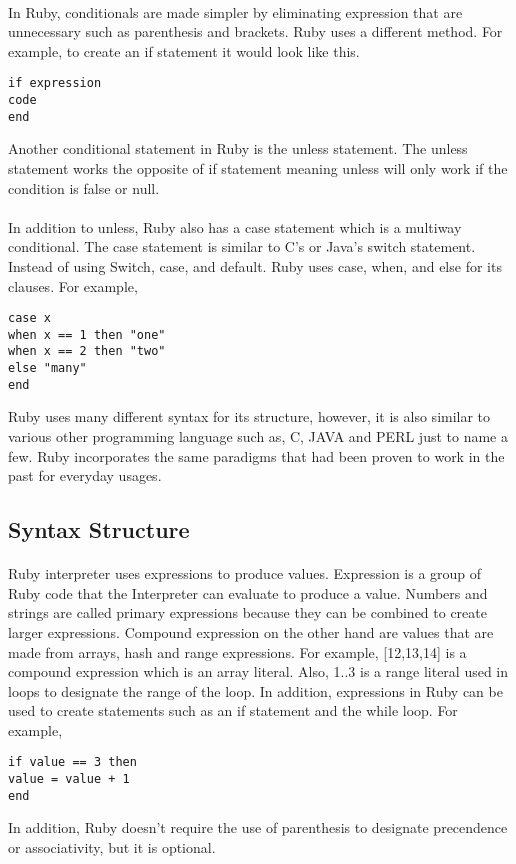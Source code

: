 \documentclass[11pt]{article}
\begin{document}
\paragraph{}
In Ruby, conditionals are made simpler by eliminating expression that are unnecessary such as parenthesis and brackets. Ruby uses a different method. For example, to create an if statement it would look like this. 
\begin{center}

\texttt{if expression \\ code \\ end }

\end{center}
Another conditional statement in Ruby is the unless statement. The unless statement works the opposite of if statement meaning unless will only work if the condition is false or null.
\paragraph{}
In addition to unless, Ruby also has a case statement which is a multiway conditional. The case statement is similar to C's or Java's switch statement. Instead of using Switch, case, and default. Ruby uses case, when, and else for its clauses. For example, 
\begin{center}
 \texttt{case x \\ when x == 1 then "one" \\ when x == 2 then "two" \\ else "many" \\end  }
\end{center}
Ruby uses many different syntax for its structure, however, it is also similar to various other programming language such as, C, JAVA and PERL just to name a few. Ruby incorporates the same paradigms that had been proven to work in the past for everyday usages.
\subsection{Syntax Structure}
\paragraph{}
Ruby interpreter uses expressions to produce values. Expression is a group of Ruby code that the Interpreter can evaluate to produce a value. Numbers and strings are called primary expressions because they can be combined to create larger expressions.\cite{baba} Compound expression on the other hand are values that are made from arrays, hash and range expressions. For example, [12,13,14] is a compound expression which is an array literal. Also, 1..3 is a range literal used in loops to designate the range of the loop.  In addition, expressions in Ruby can be used to create statements such as an if statement and the while loop. For example,
\begin{center}
 \texttt{if value == 3 then \\ 	value = value + 1 \\ end }
\end{center}
In addition, Ruby doesn't require the use of parenthesis to designate precendence or associativity, but it is optional. 
\end{document}
